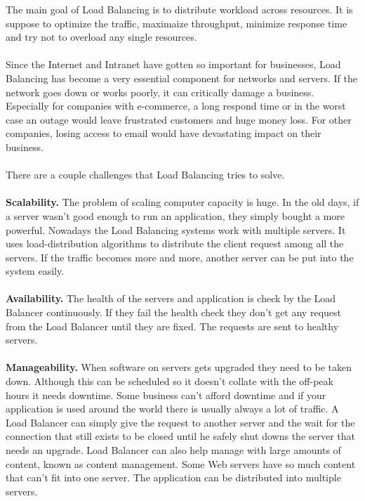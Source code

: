 \documentclass[12p]{article}
\begin{document}
	
	The main goal of Load Balancing is to distribute workload across resources. It is suppose to optimize the traffic, maximaize throughput, minimize response time and try not to overload any single resources. \\\\
	Since the Internet and Intranet have gotten so important for businesses, Load Balancing has become a very essential component for networks and servers. If the network goes down or works poorly, it can critically damage a business. Especially for companies with e-commerce, a long respond time or in the worst case an outage would leave frustrated customers and huge money loss. For other companies, losing access to email would have devastating impact on their business.  \cite{lb_SFC} \\\\
	There are a couple challenges that Load Balancing tries to solve. \\\\ 
	\textbf{Scalability.} The problem of scaling computer capacity is huge. In the old days, if a server wasn't good enough to run an application, they simply bought a more powerful. Nowadays the Load Balancing systems work with multiple servers. It uses load-distribution algorithms to distribute the client request among all the servers.
	If the traffic becomes more and more, another server can be put into the system easily. \cite{lb_SFC} \\\\
	\textbf{Availability.} The health of the servers and application is check by the Load Balancer continuously. If they fail the health check they don't get any request from the Load Balancer until they are fixed. The requests are sent to healthy servers. \cite{lb_SFC} \\\\ 
	\textbf{Manageability.} When software on servers gets upgraded they need to be taken down. Although this can be scheduled so it doesn't collate with the off-peak hours it needs downtime. Some business can't afford downtime and if your application is used around the world there is usually always a lot of traffic. A Load Balancer can simply give the request to another server and the wait for the connection that still exists to be closed until he safely shut downs the server that needs an upgrade. 
	Load Balancer can also help manage with large amounts of content, known as content management. Some Web servers have so much content that can't fit into one server. The application can be distributed into multiple servers.\cite{lb_SFC}
	
\end{document}
